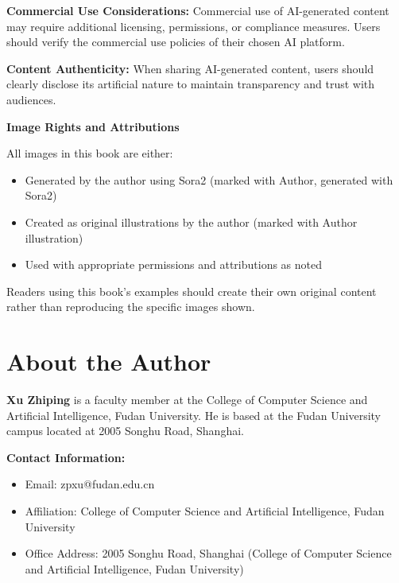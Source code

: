 \documentclass[11pt,letterpaper]{book}
\begin{document}
\textbf{Commercial Use Considerations:} Commercial use of AI-generated content may require additional licensing, permissions, or compliance measures. Users should verify the commercial use policies of their chosen AI platform.

\textbf{Content Authenticity:} When sharing AI-generated content, users should clearly disclose its artificial nature to maintain transparency and trust with audiences.

\vspace{0.5cm}

\textbf{Image Rights and Attributions}

All images in this book are either:
\begin{itemize}
\item Generated by the author using Sora2 (marked with \textcopyright{} Author, generated with Sora2)
\item Created as original illustrations by the author (marked with \textcopyright{} Author illustration)
\item Used with appropriate permissions and attributions as noted
\end{itemize}

Readers using this book's examples should create their own original content rather than reproducing the specific images shown.

\vspace*{\fill}

\newpage
\chapter*{About the Author}

\textbf{Xu Zhiping} is a faculty member at the College of Computer Science and Artificial Intelligence, Fudan University. He is based at the Fudan University campus located at 2005 Songhu Road, Shanghai.

\textbf{Contact Information:}
\begin{itemize}
\item Email: zpxu@fudan.edu.cn
\item Affiliation: College of Computer Science and Artificial Intelligence, Fudan University
\item Office Address: 2005 Songhu Road, Shanghai (College of Computer Science and Artificial Intelligence, Fudan University)
\end{itemize}
\end{document}
